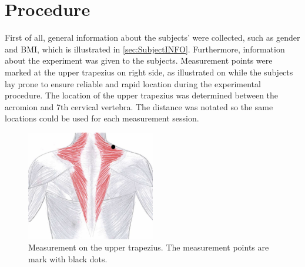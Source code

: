 


\section{Procedure}
First of all, general information about the subjects’ were collected, such as gender and BMI, which is illustrated in \autoref{sec:SubjectINFO}. Furthermore, information about the experiment was given to the subjects. Measurement points were marked at the upper trapezius on right side, as illustrated on  while the subjects lay prone to ensure reliable and rapid location during the experimental procedure. The location of the upper trapezius was determined between the acromion and 7th cervical vertebra. The distance was notated so the same locations could be used for each measurement session. 

\begin{figure}[H]
	\includegraphics[width=0.5\textwidth]{figures/trapezius} 
	\caption{Measurement on the upper trapezius. The measurement points are mark with black dots.}
	\label{fig:trapezius}  
\end{figure}  

